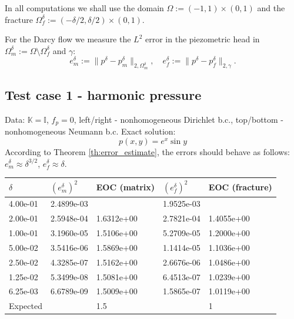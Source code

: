 \documentclass[a4paper]{article}
\def\tn#1{{\mathbb{#1}}}    %
\def\norm#1{\|#1\|}
\begin{document}
In all computations we shall use the domain $\Omega:=(-1,1)\times(0,1)$ and the fracture $\Omega_f^\delta:=(-\delta/2,\delta/2)\times(0,1)$.

For the Darcy flow we measure the $L^2$ error in the piezometric head in $\Omega_m^\delta:=\Omega\setminus\Omega_f^\delta$ and $\gamma$:
\[ e_m^\delta := \norm{p^\delta - p_m^\delta}_{2,\Omega_m^\delta},\quad e_f^\delta := \norm{p^\delta - p_f^\delta}_{2,\gamma}. \]


\subsection{Test case 1 - harmonic pressure}

Data: $\tn K=\tn I$, $f_p=0$, left/right - nonhomogeneous Dirichlet b.c., top/bottom - nonhomogeneous Neumann b.c.
Exact solution:
\[ p(x,y) = e^x\sin y \]
According to Theorem \ref{th:error_estimate}, the errors should behave as follows: $e_m^\delta\approx\delta^{3/2}$, $e_f^\delta\approx\delta$.

\begin{tabular}{|l|ll|ll|}
\hline
$\delta$ & $(e_m^\delta)^2$ & EOC (matrix) & $(e_f^\delta)^2$ & EOC (fracture)\\
\hline
4.00e-01 & 2.4899e-03 &            & 1.9525e-03 & \\
2.00e-01 & 2.5948e-04 & 1.6312e+00 & 2.7821e-04 & 1.4055e+00\\
1.00e-01 & 3.1960e-05 & 1.5106e+00 & 5.2709e-05 & 1.2000e+00\\
5.00e-02 & 3.5416e-06 & 1.5869e+00 & 1.1414e-05 & 1.1036e+00\\
2.50e-02 & 4.3285e-07 & 1.5162e+00 & 2.6676e-06 & 1.0486e+00\\
1.25e-02 & 5.3499e-08 & 1.5081e+00 & 6.4513e-07 & 1.0239e+00\\
6.25e-03 & 6.6789e-09 & 1.5009e+00 & 1.5865e-07 & 1.0119e+00\\
\hline
Expected & & 1.5 & & 1\\
\hline
\end{tabular}
\end{document}
